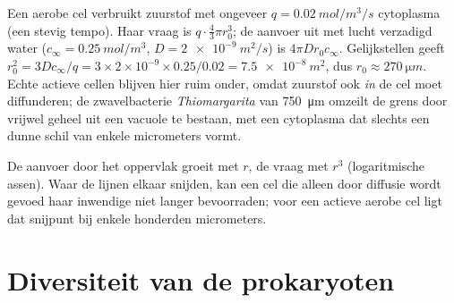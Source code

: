 \begin{example}\label{ex:b2:unicellular-diversity:howbig}
Een aerobe cel verbruikt zuurstof met ongeveer $q = \qty{0.02}{mol/m^3/s}$
cytoplasma (een stevig tempo). Haar vraag is $q \cdot \tfrac{4}{3}\pi
r_0^3$; de aanvoer uit met lucht verzadigd water ($c_\infty =
\qty{0.25}{mol/m^3}$, $D = \qty{2e-9}{m^2/s}$) is $4\pi D r_0
c_\infty$. Gelijkstellen geeft $r_0^2 = 3Dc_\infty/q = 3\times 2\times 10^{-9}
\times 0.25/0.02 = \qty{7.5e-8}{m^2}$, dus $r_0 \approx
\qty{270}{\micro m}$. Echte actieve cellen blijven hier ruim onder,
omdat zuurstof ook \emph{in} de cel moet diffunderen; de zwavelbacterie
\emph{Thiomargarita} van \qty{750}{\micro m} omzeilt de grens door
vrijwel geheel uit een vacuole te bestaan, met een cytoplasma dat
slechts een dunne schil van enkele micrometers vormt.
\end{example}

\begin{omfigure}

{\small De aanvoer door het oppervlak groeit met $r$, de vraag met
$r^3$ (logaritmische assen). Waar de lijnen elkaar snijden, kan een
cel die alleen door diffusie wordt gevoed haar inwendige niet langer
bevoorraden; voor een actieve aerobe cel ligt dat snijpunt bij enkele
honderden micrometers.}
\end{omfigure}

\section{Diversiteit van de prokaryoten}

